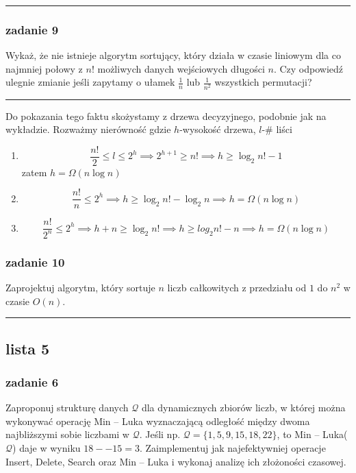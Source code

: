 \documentclass[11pt,a4paper]{article}
\begin{document}
\bigskip
\hrule
\bigskip


\subsubsection{zadanie 9}
Wykaż, że nie istnieje algorytm sortujący, który działa w czasie liniowym dla co najmniej połowy z $n!$ możliwych danych wejściowych długości $n$. Czy odpowiedź ulegnie zmianie jeśli zapytamy o ułamek $\frac{1}{n}$ lub $\frac{1}{n^2}$ wszystkich permutacji?

\bigskip
\hrule
\bigskip

Do pokazania tego faktu skożystamy z drzewa decyzyjnego, podobnie jak na wykładzie. Rozważmy nierówność gdzie $h$-wysokość drzewa, $l$-# liści
\begin{enumerate}
    \item
        \[
            \frac{n!}{2} \leq l \leq 2^h \implies 2^{h+1} \geq n! \implies h \geq \log_2 n! -1
        \]
        zatem $h = \Omega (n \log n)$
    \item
        \[
            \frac{n!}{n} \leq 2^h \implies h \geq \log_2 n! - \log_2 n \implies h = \Omega(n \log n)
        \]
    \item
        \[
            \frac{n!}{2^n} \leq 2^h \implies h+n \geq \log_2 n! \implies h \geq log_2 n! - n \implies h = \Omega(n \log n)
        \]
\end{enumerate}

\subsubsection{zadanie 10}
Zaprojektuj algorytm, który sortuje $n$ liczb całkowitych z przedziału od $1$ do $n^2$ w czasie $O(n)$.

\bigskip
\hrule
\bigskip

\subsection{lista 5}
\subsubsection{zadanie 6}
Zaproponuj strukturę danych $\mathcal{Q}$ dla dynamicznych zbiorów liczb, w której można wykonywać operację Min -- Luka wyznaczającą odległość między dwoma najbliższymi sobie liczbami w $\mathcal{Q}$. Jeśli np. $\mathcal{Q} = \{1, 5, 9, 15, 18, 22\}$, to Min -- Luka($\mathcal{Q}$) daje w wyniku $18 -- 15 = 3$. Zaimplementuj jak najefektywniej operacje Insert, Delete, Search oraz Min -- Luka i wykonaj analizę ich złożoności czasowej.
\end{document}
